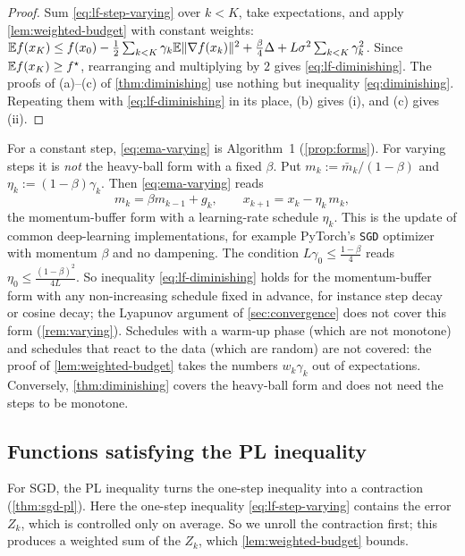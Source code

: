 \begin{proof}
Sum \eqref{eq:lf-step-varying} over $k<K$, take expectations, and apply
\cref{lem:weighted-budget} with constant weights:
$\mathbb{E} f(x_K)\le f(x_0)-\frac12\sum_{k<K}\gamma_k\mathbb{E}\lVert \nabla f(x_k)\rVert^2+\frac\beta4\Delta+L\sigma^2\sum_{k<K}\gamma_k^2$.
Since $\mathbb{E} f(x_K)\ge f^\star$, rearranging and multiplying by $2$ gives \eqref{eq:lf-diminishing}.
The proofs of (a)--(c) of \cref{thm:diminishing} use nothing but inequality
\eqref{eq:diminishing}. Repeating them with \eqref{eq:lf-diminishing} in its place, (b)
gives (i), and (c) gives (ii).
\end{proof}

\begin{remark}\label{rem:which-algorithm}
For a constant step, \eqref{eq:ema-varying} is Algorithm~1 (\cref{prop:forms}). For
varying steps it is \emph{not} the heavy-ball form with a fixed $\beta$. Put
$m_k:=\bar m_k/(1-\beta)$ and $\eta_k:=(1-\beta)\gamma_k$. Then \eqref{eq:ema-varying} reads
\[
  m_k=\beta m_{k-1}+g_k,\qquad x_{k+1}=x_k-\eta_k\,m_k ,
\]
the momentum-buffer form with a learning-rate schedule $\eta_k$. This is the update of
common deep-learning implementations, for example PyTorch's \texttt{SGD} optimizer with
momentum $\beta$ and no dampening. The condition $L\gamma_0\le\frac{1-\beta}{4}$ reads
$\eta_0\le\frac{(1-\beta)^2}{4L}$. So inequality \eqref{eq:lf-diminishing} holds for the momentum-buffer form with any
non-increasing schedule fixed in advance, for instance step decay or cosine decay; the
Lyapunov argument of \cref{sec:convergence} does not cover this form (\cref{rem:varying}).
Schedules with a warm-up phase (which are not monotone) and schedules that react to the
data (which are random) are not covered: the proof of \cref{lem:weighted-budget} takes the
numbers $w_k\gamma_k$ out of expectations. Conversely, \cref{thm:diminishing} covers the
heavy-ball form and does not need the steps to be monotone.
\end{remark}

\subsection{Functions satisfying the PL inequality}

For SGD, the PL inequality turns the one-step inequality into a contraction
(\cref{thm:sgd-pl}). Here the one-step inequality \eqref{eq:lf-step-varying} contains the
error $Z_k$, which is controlled only on average. So we unroll the contraction first; this
produces a weighted sum of the $Z_k$, which \cref{lem:weighted-budget} bounds.

